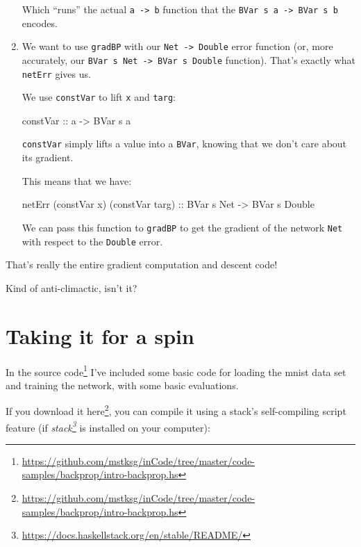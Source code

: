 \documentclass[]{article}
\newenvironment{Shaded}{}{}
\newcommand{\DataTypeTok}[1]{\textcolor[rgb]{0.56,0.13,0.00}{#1}}
\newcommand{\NormalTok}[1]{#1}
\newcommand{\OtherTok}[1]{\textcolor[rgb]{0.00,0.44,0.13}{#1}}
\renewcommand{\href}[2]{#2\footnote{\url{#1}}}
\begin{document}
\begin{enumerate}
  Which ``runs'' the actual \texttt{a\ -\textgreater{}\ b} function that the
  \texttt{BVar\ s\ a\ -\textgreater{}\ BVar\ s\ b} encodes.
\item
  We want to use \texttt{gradBP} with our \texttt{Net\ -\textgreater{}\ Double}
  error function (or, more accurately, our
  \texttt{BVar\ s\ Net\ -\textgreater{}\ BVar\ s\ Double} function). That's
  exactly what \texttt{netErr} gives us.

  We use \texttt{constVar} to lift \texttt{x} and \texttt{targ}:

\begin{Shaded}
\begin{Highlighting}[]
\OtherTok{constVar ::}\NormalTok{ a }\OtherTok{{-}\textgreater{}} \DataTypeTok{BVar}\NormalTok{ s a}
\end{Highlighting}
\end{Shaded}

  \texttt{constVar} simply lifts a value into a \texttt{BVar}, knowing that we
  don't care about its gradient.

  This means that we have:

\begin{Shaded}
\begin{Highlighting}[]
\NormalTok{netErr (constVar x) (constVar targ)}\OtherTok{ ::} \DataTypeTok{BVar}\NormalTok{ s }\DataTypeTok{Net} \OtherTok{{-}\textgreater{}} \DataTypeTok{BVar}\NormalTok{ s }\DataTypeTok{Double}
\end{Highlighting}
\end{Shaded}

  We can pass this function to \texttt{gradBP} to get the gradient of the
  network \texttt{Net} with respect to the \texttt{Double} error.
\end{enumerate}

That's really the entire gradient computation and descent code!

Kind of anti-climactic, isn't it?

\section{Taking it for a spin}\label{taking-it-for-a-spin}

In the
\href{https://github.com/mstksg/inCode/tree/master/code-samples/backprop/intro-backprop.hs}{source
code} I've included some basic code for loading the mnist data set and training
the network, with some basic evaluations.

If you download it
\href{https://github.com/mstksg/inCode/tree/master/code-samples/backprop/intro-backprop.hs}{here},
you can compile it using a stack's self-compiling script feature (if
\emph{\href{https://docs.haskellstack.org/en/stable/README/}{stack}} is
installed on your computer):
\end{document}
